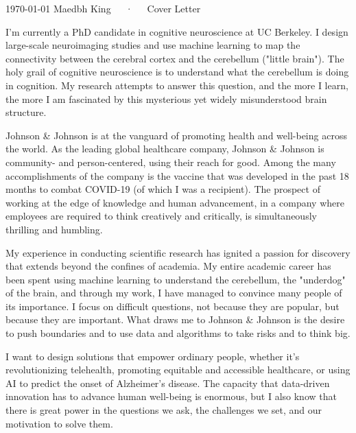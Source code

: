 \documentclass[11pt, a4paper]{maedbh-cv}
\begin{document}
\makecvheader[R]

\makecvfooter
  {\today}
  {Maedbh King~~~·~~~Cover Letter}
  {}

\makelettertitle

\begin{cvletter}

I'm currently a PhD candidate in cognitive neuroscience at UC Berkeley. I design large-scale neuroimaging studies and use machine learning to map the connectivity between the cerebral cortex and the cerebellum ("little brain"). The holy grail of cognitive neuroscience is to understand what the cerebellum is doing in cognition. My research attempts to answer this question, and the more I learn, the more I am fascinated by this mysterious yet widely misunderstood brain structure.

Johnson \& Johnson is at the vanguard of promoting health and well-being across the world. As the leading global healthcare company, Johnson \& Johnson is community- and person-centered, using their reach for good. Among the many accomplishments of the company is the vaccine that was developed in the past 18 months to combat COVID-19 (of which I was a recipient). The prospect of working at the edge of knowledge and human advancement, in a company where employees are required to think creatively and critically, is simultaneously thrilling and humbling.

My experience in conducting scientific research has ignited a passion for discovery that extends beyond the confines of academia. My entire academic career has been spent using machine learning to understand the cerebellum, the "underdog" of the brain, and through my work, I have managed to convince many people of its importance. I focus on difficult questions, not because they are popular, but because they are important. What draws me to Johnson \& Johnson is the desire to push boundaries and to use data and algorithms to take risks and to think big.

I want to design solutions that empower ordinary people, whether it's revolutionizing telehealth, promoting equitable and accessible healthcare, or using AI to predict the onset of Alzheimer's disease. The capacity that data-driven innovation has to advance human well-being is enormous, but I also know that there is great power in the questions we ask, the challenges we set, and our motivation to solve them.

\end{cvletter}


\makeletterclosing
\end{document}
